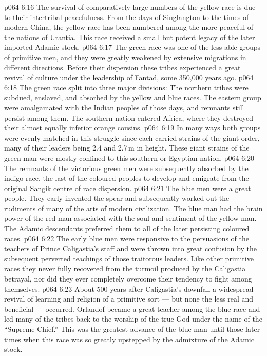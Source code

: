 \vs p064 6:16 The survival of comparatively large numbers of the yellow race is due to their intertribal peacefulness. From the days of Singlangton to the times of modern China, the yellow race has been numbered among the more peaceful of the nations of Urantia. This race received a small but potent legacy of the later imported Adamic stock.
\vs p064 6:17 \bibnobreakspace {} The green race was one of the less able groups of primitive men, and they were greatly weakened by extensive migrations in different directions. Before their dispersion these tribes experienced a great revival of culture under the leadership of Fantad, some 350,000 years ago.
\vs p064 6:18 The green race split into three major divisions: The northern tribes were subdued, enslaved, and absorbed by the yellow and blue races. The eastern group were amalgamated with the Indian peoples of those days, and remnants still persist among them. The southern nation entered Africa, where they destroyed their almost equally inferior orange cousins.
\vs p064 6:19 In many ways both groups were evenly matched in this struggle since each carried strains of the giant order, many of their leaders being 2.4 and 2.7\,m in height. These giant strains of the green man were mostly confined to this southern or Egyptian nation.
\vs p064 6:20 The remnants of the victorious green men were subsequently absorbed by the indigo race, the last of the coloured peoples to develop and emigrate from the original Sangik centre of race dispersion.
\vs p064 6:21 \bibnobreakspace {} The blue men were a great people. They early invented the spear and subsequently worked out the rudiments of many of the arts of modern civilization. The blue man had the brain power of the red man associated with the soul and sentiment of the yellow man. The Adamic descendants preferred them to all of the later persisting coloured races.
\vs p064 6:22 The early blue men were responsive to the persuasions of the teachers of Prince Caligastia’s staff and were thrown into great confusion by the subsequent perverted teachings of those traitorous leaders. Like other primitive races they never fully recovered from the turmoil produced by the Caligastia betrayal, nor did they ever completely overcome their tendency to fight among themselves.
\vs p064 6:23 About 500 years after Caligastia’s downfall a widespread revival of learning and religion of a primitive sort --- but none the less real and beneficial --- occurred. Orlandof became a great teacher among the blue race and led many of the tribes back to the worship of the true God under the name of the “Supreme Chief.” This was the greatest advance of the blue man until those later times when this race was so greatly upstepped by the admixture of the Adamic stock.
